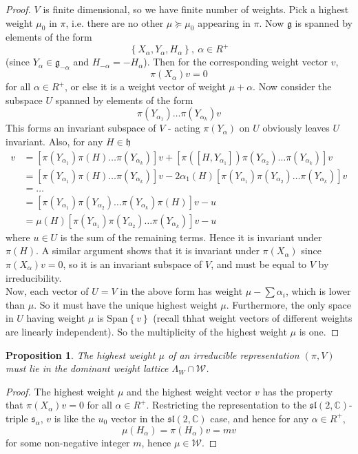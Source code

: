 \documentclass[11pt]{article}
\newtheorem{proposition}[theorem]{Proposition}
\newcommand{\bb}[1]{\mathbb{#1}}
\newcommand{\mc}[1]{\mathcal{#1}}
\newcommand{\mf}[1]{\mathfrak{#1}}
\begin{document}
\begin{proof}
$V$ is finite dimensional, so we have finite number of weights. Pick a highest weight $\mu_0$ in $\pi$, i.e. there are no other $\mu \succeq \mu_0$ appearing in $\pi$. Now $\mf{g}$ is spanned by elements of the form $$\left\{X_{\alpha}, Y_{\alpha}, H_{\alpha}\right\},\ \alpha \in R^+$$
(since $Y_{\alpha} \in \mf{g}_{-\alpha}$ and $H_{-\alpha} = -H_{\alpha}$). Then for the corresponding weight vector $v$,
$$\pi(X_{\alpha})v = 0$$
for all $\alpha \in R^+$, or else it is a weight vector of weight $\mu + \alpha$. Now consider the subspace $U$ spanned by elements of the form
$$\pi(Y_{\alpha_1})\dots \pi(Y_{\alpha_k})v$$
This forms an invariant subspace of $V$ - acting $\pi(Y_{\alpha})$ on $U$ obviously leaves $U$ invariant. Also, for any $H \in \mf{h}$
\begin{align*}
[\pi(H)\pi(Y_{\alpha_1})\dots \pi(Y_{\alpha_k})]v &= [\pi(Y_{\alpha_1})\pi(H)\dots \pi(Y_{\alpha_k})]v + [\pi([H,Y_{\alpha_1}])\pi(Y_{\alpha_2})\dots \pi(Y_{\alpha_k})]v\\
&= [\pi(Y_{\alpha_1})\pi(H)\dots \pi(Y_{\alpha_k})]v -2\alpha_1(H) [\pi(Y_{\alpha_1})\pi(Y_{\alpha_2})\dots \pi(Y_{\alpha_k})]v\\
&= \dots \\
&= [\pi(Y_{\alpha_1})\pi(Y_{\alpha_2}) \dots \pi(Y_{\alpha_k})\pi(H)]v - u\\
&= \mu(H)[\pi(Y_{\alpha_1})\pi(Y_{\alpha_2}) \dots \pi(Y_{\alpha_k})]v - u
\end{align*}
where $u \in U$ is the sum of the remaining terms. Hence it is invariant under $\pi(H)$. A similar argument shows that it is invariant under $\pi(X_{\alpha})$ since $\pi(X_{\alpha})v = 0$, so it is an invariant subspace of $V$, and must be equal to $V$ by irreducibility.\\
Now, each vector of $U = V$ in the above form has weight $\mu - \sum \alpha_i$, which is lower than $\mu$. So it must have the unique highest weight $\mu$. Furthermore, the only space in $U$ having weight $\mu$ is $\mathrm{Span}\left\{v\right\}$ (recall thhat weight vectors of different weights are linearly independent). So the multiplicity of the highest weight $\mu$ is one.
\end{proof}
\begin{proposition}
The highest weight $\mu$ of an irreducible representation $(\pi,V)$ must lie in the dominant weight lattice $\Lambda_W \cap \mc{W}$.
\end{proposition}
\begin{proof}
The highest weight $\mu$ and the highest weight vector $v$ has the property that $\pi(X_{\alpha})v = 0$ for all $\alpha \in R^+$. Restricting the representation to the $\mf{sl}(2,\bb{C})$-triple $\mf{s}_{\alpha}$, $v$ is like the $u_0$ vector in the $\mf{sl}(2,\bb{C})$ case, and hence for any $\alpha \in R^+$,
$$\mu(H_{\alpha}) = \pi(H_{\alpha})v = mv$$
for some non-negative integer $m$, hence $\mu \in \mc{W}$.
\end{proof}
\end{document}
